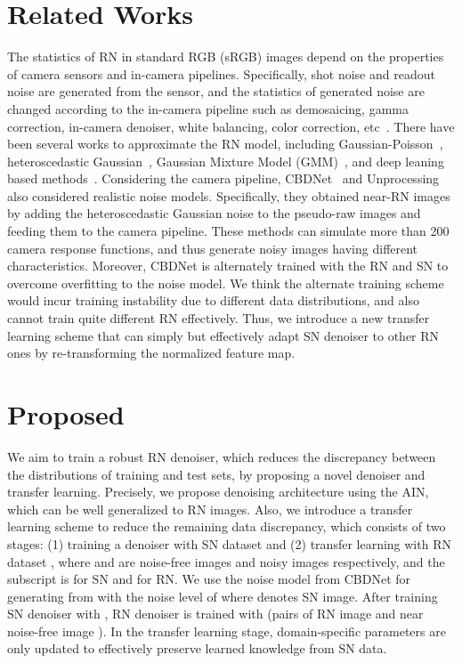 \documentclass[10pt,twocolumn,letterpaper]{article}
\begin{document}
\section{Related Works}
The statistics of RN in standard RGB (sRGB) images depend on the properties of camera sensors and in-camera pipelines.
Specifically, shot noise and readout noise are generated from the sensor, and the statistics of generated noise are changed according to the in-camera pipeline such as demosaicing, gamma correction, in-camera denoiser, white balancing, color correction, etc~\cite{ortiz2004radiometric}.
There have been several works to approximate the RN model, including Gaussian-Poisson~\cite{foi2008practical,liu2014practical}, heteroscedastic Gaussian~\cite{hasinoff2010noise}, Gaussian Mixture Model (GMM)~\cite{zhu2016noise}, and deep leaning based methods~\cite{chen2018image,abdelhamed2019noise}.
Considering the camera pipeline, CBDNet~\cite{guo2019toward} and Unprocessing~\cite{brooks2019unprocessing} also considered realistic noise models. Specifically, they obtained near-RN images by adding the heteroscedastic Gaussian noise to the pseudo-raw images and feeding them to the camera pipeline.
These methods can simulate more than 200 camera response functions, and thus generate noisy images having different characteristics.
Moreover, CBDNet is alternately trained with the RN and SN to overcome overfitting to the noise model.
We think the alternate training scheme would incur training instability due to different data distributions, and also cannot train quite different RN  effectively.
Thus, we introduce a new transfer learning scheme that can simply but effectively adapt SN denoiser to other RN ones by re-transforming the normalized feature map.





\section{Proposed}
We aim to train a robust RN denoiser, which reduces the discrepancy between the distributions of training and test sets, by proposing a novel denoiser and transfer learning.
Precisely, we propose denoising architecture using the AIN, which can be well generalized to RN images.
Also, we introduce a transfer learning scheme to reduce the remaining data discrepancy, which consists of two stages:
(1) training a denoiser with SN dataset  and (2) transfer learning with RN dataset , where  and  are noise-free images and noisy images respectively, and the subscript  is for SN and  for RN. We use the noise model from CBDNet for generating  from  with the noise level of   where  denotes SN image.  
After training SN denoiser with , RN denoiser is trained with  (pairs of RN image  and near noise-free image ). 
In the transfer learning stage, domain-specific parameters are only updated to effectively preserve learned knowledge from SN data.
\end{document}
